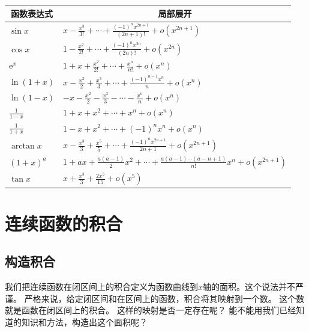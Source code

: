 \documentclass[12pt,UTF8]{ctexbook}
\newcommand{\olim}[1]{\mathit{o}\left(#1\right)}  %
\theoremstyle{definition}
\theoremstyle{plain}
\begin{document}
\begin{appendix}
\begin{center}
    \renewcommand{\arraystretch}{2}
    \setlength{\extrarowheight}{-3pt}
    \begin{longtable}{|l|l|}
        \hline \multicolumn{1}{|c|}{\textbf{函数表达式}} & \multicolumn{1}{c|}{\textbf{局部展开}} \\[4pt] 
        \hline    
        $\sin{x}$ & $x - \frac{x^3}{3!} + \cdots + \frac{(-1)^n x^{2n+1}}{(2n+1)!} + \olim{x^{2n+1}} $ \\[4pt]
        \hline
        $\cos{x}$ & $1 - \frac{x^2}{2!} + \cdots + \frac{(-1)^n x^{2n}}{(2n)!} + \olim{x^{2n}} $ \\[4pt]
        \hline
        $\mathrm{e}^x$ & $1 + x + \frac{x^2}{2!} + \cdots + \frac{x^n}{n!} + \olim{x^n}$ \\[4pt]
        \hline
        $\ln{(1 + x)}$ & $x - \frac{x^2}{2} + \frac{x^3}{3} + \cdots + \frac{(-1)^{n-1}x^{n}}{n} + \olim{x^{n}}$ \\[4pt]  
        \hline
        $\ln{(1 - x)}$ & $- x - \frac{x^2}{2} - \frac{x^3}{3} - \cdots - \frac{x^{n}}{n} + \olim{x^{n}}$ \\[4pt]  
        \hline
        $\frac{1}{1 - x}$ & $1 + x + x^2 + \cdots + x^n + \olim{x^{n}}$ \\[4pt]  
        \hline
        $\frac{1}{1 + x}$ & $1 - x + x^2 + \cdots + (-1)^n x^n + \olim{x^{n}}$ \\[4pt]  
        \hline
        $\arctan{x}$ & $x - \frac{x^3}{3} + \frac{x^5}{5} + \cdots + \frac{(-1)^n x^{2n+1}}{2n+1} + \olim{x^{2n+1}}$ \\[4pt]  
        \hline
        $(1 + x)^a$ & $1 + ax + \frac{a(a - 1)}{2}x^2 + \cdots + \frac{a(a - 1)\cdots(a - n + 1)}{n!}x^n + \olim{x^{2n+1}}$ \\[4pt] 
        \hline
        $\tan{x}$ & $x + \frac{x^3}{3} + \frac{2x^5}{15} + \olim{x^{5}}$ \\[4pt]
        \hline
    \end{longtable}
\end{center}

\chapter{连续函数的积合}

\section{构造积合}

我们把连续函数在闭区间上的积合定义为函数曲线到$x$轴的面积。这个说法并不严谨。
严格来说，给定闭区间和在区间上的函数，积合将其映射到一个数。
这个数就是函数在闭区间上的积合。
这样的映射是否一定存在呢？
能不能用我们已经知道的知识和方法，构造出这个面积呢？


\end{appendix}
\end{document}

